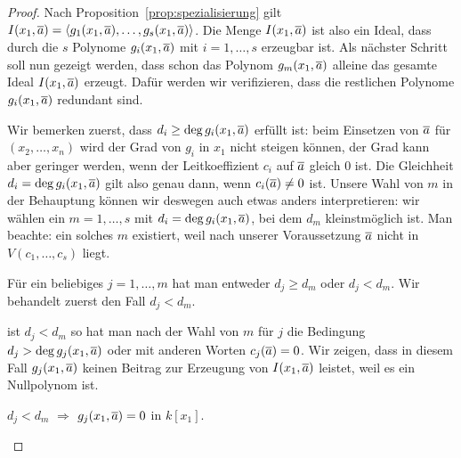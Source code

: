 \documentclass[11pt]{article}
\numberwithin{equation}{section}
\begin{document}
\begin{proof}
	Nach Proposition~\ref{prop:spezialisierung} gilt 
	 $I(x_1,\overline{a}) = \left<  g_1(x_1,\overline{a}),\ldots, g_s(x_1,\overline{a})  \right>$. Die Menge $I(x_1,\overline{a})$ ist also ein Ideal, dass durch die $s$ Polynome $g_i (x_1,\overline{a})$ mit $i =1,\ldots,s$ erzeugbar ist. Als nächster Schritt soll nun gezeigt werden, dass schon das Polynom $g_m(x_1,\overline{a})$ alleine das gesamte Ideal $I(x_1,\overline{a})$ erzeugt. Dafür werden wir verifizieren, dass die restlichen Polynome $g_i(x_1,\overline{a})$ redundant sind. 
	
	Wir bemerken zuerst, dass $d_i \ge \deg g_i(x_1, \overline{a})$ erfüllt ist: beim Einsetzen von $\overline{a}$ für $(x_2,\ldots,x_n)$ wird der Grad von $g_i$ in $x_1$ nicht steigen können,  der Grad kann aber geringer werden, wenn der Leitkoeffizient $c_i$ auf $\overline{a}$ gleich $0$ ist. Die Gleichheit $d_i = \deg g_i(x_1,\overline{a})$ gilt also genau dann, wenn $c_i(\overline{a}) \ne 0$ ist. Unsere Wahl von $m$ in der Behauptung können wir deswegen auch etwas anders interpretieren: wir wählen ein $m =1,\ldots,s$ mit $d_i = \deg g_i(x_1, \overline{a})$, bei dem $d_m$ kleinstmöglich ist. Man beachte: ein solches $m$ existiert, weil nach unserer Voraussetzung $\overline{a}$ nicht in $V(c_1,\ldots,c_s)$ liegt. 
	
	Für ein beliebiges $j =1,\ldots,m$ hat man entweder $d_j \ge d_m$ oder $d_j < d_m$. Wir behandelt zuerst den Fall $d_j < d_m$. 
	
	ist $d_j < d_m$ so hat man nach der Wahl von $m$ für $j$ die Bedingung $d_j > \deg g_j(x_1,\overline{a})$ oder mit anderen Worten $c_j(\overline{a}) = 0$. Wir zeigen, dass in diesem Fall $g_j(x_1,\overline{a})$ keinen Beitrag zur Erzeugung von $I(x_1,\overline{a})$ leistet, weil es ein Nullpolynom ist. 
	
	\begin{claim*} $d_j < d_m$ $\Rightarrow$ $g_j(x_1,\overline{a}) = 0$ in $k[x_1]$. 
	\end{claim*}
	

\end{proof}
\end{document}
